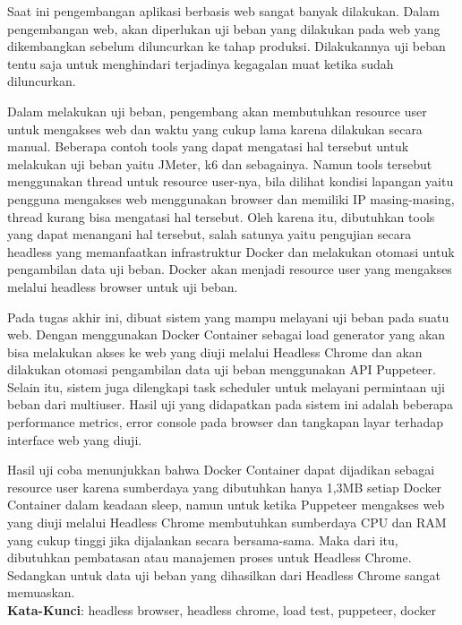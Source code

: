 \begin{abstrak}
		Saat ini pengembangan aplikasi berbasis web sangat banyak dilakukan. Dalam pengembangan web, akan diperlukan uji beban yang dilakukan pada web yang dikembangkan sebelum diluncurkan ke tahap produksi. Dilakukannya uji beban tentu saja untuk menghindari terjadinya kegagalan muat ketika sudah diluncurkan.
		
		\indent Dalam melakukan uji beban, pengembang akan membutuhkan resource user untuk mengakses web dan waktu yang cukup lama karena dilakukan secara manual. Beberapa contoh tools yang dapat mengatasi hal tersebut untuk melakukan uji beban yaitu JMeter, k6 dan sebagainya. Namun tools tersebut menggunakan thread untuk resource user-nya, bila dilihat kondisi lapangan yaitu pengguna mengakses web menggunakan browser dan memiliki IP masing-masing, thread kurang bisa mengatasi hal tersebut. Oleh karena itu, dibutuhkan tools yang dapat menangani hal tersebut, salah satunya yaitu pengujian secara headless yang memanfaatkan infrastruktur Docker dan melakukan otomasi untuk pengambilan data uji beban. Docker akan menjadi resource user yang mengakses melalui headless browser untuk uji beban.
		
		\indent Pada tugas akhir ini, dibuat sistem yang mampu melayani uji beban pada suatu web. Dengan menggunakan Docker Container sebagai load generator yang akan bisa melakukan akses ke web yang diuji melalui Headless Chrome dan akan dilakukan otomasi pengambilan data uji beban menggunakan API Puppeteer. Selain itu, sistem juga dilengkapi task scheduler untuk melayani permintaan uji beban dari multiuser. Hasil uji yang didapatkan pada sistem ini adalah beberapa performance metrics, error console pada browser dan tangkapan layar terhadap interface web yang diuji.
		
		\indent Hasil uji coba menunjukkan bahwa Docker Container dapat dijadikan sebagai resource user karena sumberdaya yang dibutuhkan hanya 1,3MB setiap Docker Container dalam keadaan sleep, namun untuk ketika Puppeteer mengakses web yang diuji melalui Headless Chrome membutuhkan sumberdaya CPU dan RAM yang cukup tinggi jika dijalankan secara bersama-sama. Maka dari itu, dibutuhkan pembatasan atau manajemen proses untuk Headless Chrome. Sedangkan untuk data uji beban yang dihasilkan dari Headless Chrome sangat memuaskan. \\

	\noindent \textbf{Kata-Kunci}: headless browser, headless chrome, load test, puppeteer, docker
\end{abstrak}

